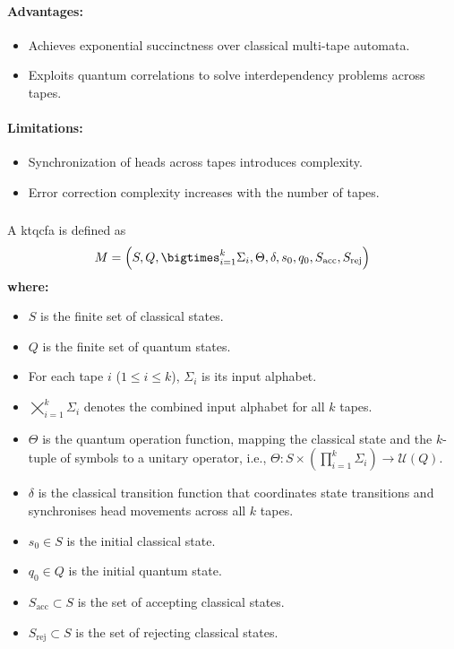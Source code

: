 \paragraph{Advantages:}
\begin{itemize}
    \item Achieves exponential succinctness over classical multi-tape automata.
    \item Exploits quantum correlations to solve interdependency problems across tapes.
\end{itemize}

\paragraph{Limitations:}
\begin{itemize}
    \item Synchronization of heads across tapes introduces complexity.
    \item Error correction complexity increases with the number of tapes.
\end{itemize}

\subsubsection{}
\label{subsec:ktqcfa}
\begin{definition}
A \gls{ktqcfa} is defined as 
\[
M = \Bigl(S, Q, \bigtimes_{i=1}^{k} \Sigma_i, \Theta, \delta, s_0, q_0, S_{\text{acc}}, S_{\text{rej}}\Bigr)
\]
\textbf{where:}
\begin{itemize}
    \item \( S \) is the finite set of classical states.
    \item \( Q \) is the finite set of quantum states.
    \item For each tape \( i \) (\( 1 \leq i \leq k \)), \( \Sigma_i \) is its input alphabet.
    \item \( \bigtimes_{i=1}^{k} \Sigma_i \) denotes the combined input alphabet for all \( k \) tapes.
    \item \( \Theta \) is the quantum operation function, mapping the classical state and the \( k \)-tuple of symbols to a unitary operator, i.e., \(\Theta: S \times \left(\prod_{i=1}^{k} \Sigma_i\right) \to \mathcal{U}(Q)\).
    \item \( \delta \) is the classical transition function that coordinates state transitions and synchronises head movements across all \( k \) tapes.
    \item \( s_0 \in S \) is the initial classical state.
    \item \( q_0 \in Q \) is the initial quantum state.
    \item \( S_{\text{acc}} \subset S \) is the set of accepting classical states.
    \item \( S_{\text{rej}} \subset S \) is the set of rejecting classical states.
\end{itemize}
\end{definition}

